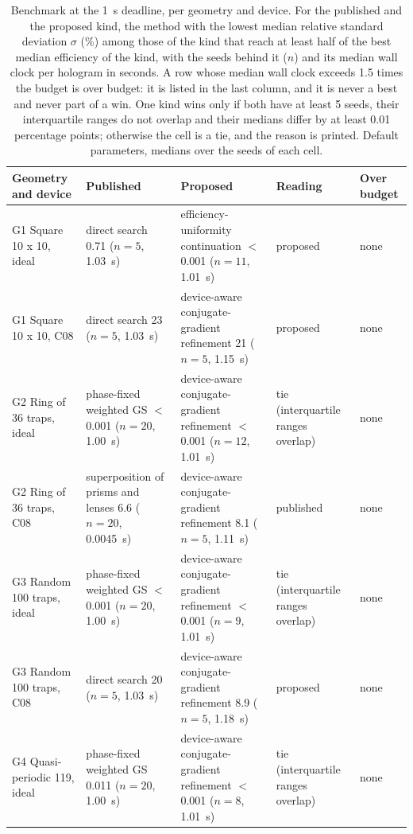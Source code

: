 \begin{table}[t]\centering\scriptsize\setlength{\tabcolsep}{3pt}
\caption{Benchmark at the 1~s deadline, per geometry and device. For the published and the proposed kind, the method with the lowest median relative standard deviation $\sigma$ (\%) among those of the kind that reach at least half of the best median efficiency of the kind, with the seeds behind it ($n$) and its median wall clock per hologram in seconds. A row whose median wall clock exceeds 1.5 times the budget is over budget: it is listed in the last column, and it is never a best and never part of a win. One kind wins only if both have at least 5 seeds, their interquartile ranges do not overlap and their medians differ by at least 0.01 percentage points; otherwise the cell is a tie, and the reason is printed. Default parameters, medians over the seeds of each cell.}\label{tab:benchmark}
\begin{tabular}{@{}>{\raggedright\arraybackslash}p{} >{\raggedright\arraybackslash}p{} >{\raggedright\arraybackslash}p{} >{\raggedright\arraybackslash}p{} >{\raggedright\arraybackslash}p{}@{}}\toprule Geometry and device & Published & Proposed & Reading & Over budget\\\midrule
G1 Square 10 x 10, ideal & direct search 0.71 ($n=5$, 1.03~s) & efficiency-uniformity continuation $<$0.001 ($n=11$, 1.01~s) & proposed & none\\
G1 Square 10 x 10, C08 & direct search 23 ($n=5$, 1.03~s) & device-aware conjugate-gradient refinement 21 ($n=5$, 1.15~s) & proposed & none\\
G2 Ring of 36 traps, ideal & phase-fixed weighted GS $<$0.001 ($n=20$, 1.00~s) & device-aware conjugate-gradient refinement $<$0.001 ($n=12$, 1.01~s) & tie (interquartile ranges overlap) & none\\
G2 Ring of 36 traps, C08 & superposition of prisms and lenses 6.6 ($n=20$, 0.0045~s) & device-aware conjugate-gradient refinement 8.1 ($n=5$, 1.11~s) & published & none\\
G3 Random 100 traps, ideal & phase-fixed weighted GS $<$0.001 ($n=20$, 1.00~s) & device-aware conjugate-gradient refinement $<$0.001 ($n=9$, 1.01~s) & tie (interquartile ranges overlap) & none\\
G3 Random 100 traps, C08 & direct search 20 ($n=5$, 1.03~s) & device-aware conjugate-gradient refinement 8.9 ($n=5$, 1.18~s) & proposed & none\\
G4 Quasi-periodic 119, ideal & phase-fixed weighted GS 0.011 ($n=20$, 1.00~s) & device-aware conjugate-gradient refinement $<$0.001 ($n=8$, 1.01~s) & tie (interquartile ranges overlap) & none\\

\end{tabular}
\end{table}
